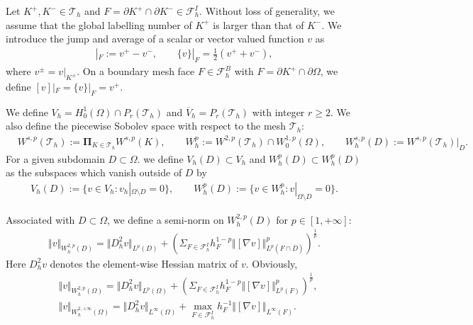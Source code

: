 \documentclass[12pt]{amsart}
\theoremstyle{definition}
\theoremstyle{remark}
\begin{document}
Let $K^{+},K^{-}\in \mathcal{T}_{h}$ and $F = \partial K^{+} \cap \partial K^{-} \in \mathcal{F}_{h}^{I}$.
Without loss of generality, we assume that the global labelling number of $K^{+}$ is larger than that of $K^{-}$. 
We introduce the jump and average of a scalar or vector valued function $v$ as 
\begin{align*}
[v]|_{F}:= v^{+} - v^{-}, \qquad \{ v \}|_{F} = \frac{1}{2}\left(v^{+} + v^{-}\right),
\end{align*}
where $v^{\pm} = v|_{K^{\pm}}$.
On a boundary mesh face $F \in \mathcal{F}_{h}^{B}$ with $F = \partial K^{+} \cap \partial\Omega$, 
we define $[v]|_{F} = \{ v\}|_{F} = v^{+}$.

We define $V_{h}=H_{0}^{1}(\Omega) \cap P_{r}(\mathcal{T}_{h})$ and $\overline{V}_{h} = P_{r}(\mathcal{T}_{h})$ 
with integer $r \geq 2$. We also define the piecewise Sobolev space with respect to the mesh $\mathcal{T}_{h}$: 
\begin{align*}
& W^{s,p}(\mathcal{T}_{h}):= \boldsymbol{\Pi}_{K \in \mathcal{T}_{h}} W^{s,p}(K), \qquad 
W_{h}^{p}:= W^{2,p}(\mathcal{T}_{h}) \cap W_{0}^{1,p}(\Omega),  
\qquad W_{h}^{s,p}(D):= W^{s,p}(\mathcal{T}_{h})|_{D}.
\end{align*}
For a given subdomain $D \subset \Omega$. we define $V_{h}(D) \subset V_{h}$ and $W_{h}^{p}(D) \subset W_{h}^{p}(D)$ 
as the subspaces which vanish outside of $D$ by 
\begin{align*}
V_{h}(D):= \{ v \in V_{h}: v_{h}|_{\Omega \setminus D} = 0 \}, \qquad 
W_{h}^{p}(D):= \{ v \in W_{h}^{p}: v|_{\Omega \setminus D} = 0 \}.
\end{align*}

Associated with $D \subset \Omega$, we define a semi-norm on $W_{h}^{2,p}(D)$ for $p \in [1, +\infty]$: 
\begin{align}
\label{discrete_second_order_norm}
\Vert v\Vert_{W_{h}^{2,p}(D)} = \Vert D_{h}^{2}v\Vert_{L^{p}(D)} 
+ \left( \Sigma_{F \in \mathcal{F}_{h}^{I}} h_{F}^{1-p}\Vert [ \nabla v] \Vert_{L^{p}(F\cap 
\overline{D})}^{p} \right)^{\frac{1}{p}}.
\end{align}
Here $D_{h}^{2}v$ denotes the element-wise Hessian matrix of $v$. Obviously, 
\begin{align*}
& \Vert v\Vert_{W_{h}^{2,p}(\Omega)} = \Vert D_{h}^{2}v\Vert_{L^{p}(\Omega)} 
+ \left( \Sigma_{F \in \mathcal{F}_{h}^{I}} h_{F}^{1-p}\Vert [ \nabla v] 
\Vert_{L^{p}(F)}^{p} \right)^{\frac{1}{p}}, \\
& \Vert v\Vert_{W_{h}^{2,+\infty}(\Omega)} = \Vert D_{h}^{2}v\Vert_{L^{\infty}(\Omega)} 
+ \max_{F \in \mathcal{F}_{h}^{I}}h_{F}^{-1}\Vert [ \nabla v]\Vert_{L^{\infty}(F)}.
\end{align*}
\end{document}
